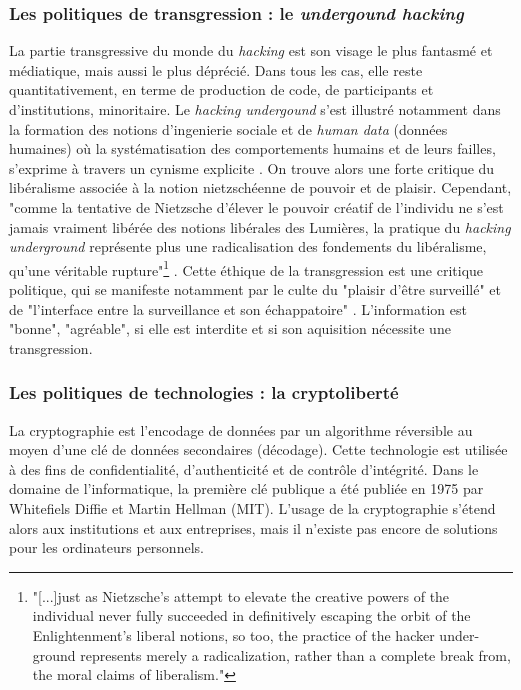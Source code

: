 \subsubsection{Les politiques de transgression : le \emph{undergound hacking}} \label{2.2.2.a}

La partie transgressive  du monde du \emph{hacking} est son visage le plus fantasmé et médiatique, mais aussi le plus déprécié. Dans tous les cas, elle reste quantitativement, en terme de production de code, de participants et d'institutions, minoritaire. Le \emph{hacking undergound} s'est illustré notamment dans la formation des notions d'ingenierie sociale et de \emph{human data} (données humaines) où la systématisation des comportements humains et de leurs failles, s'exprime à travers un cynisme explicite \citep{Mitnick+Simon2002}. On trouve alors une forte critique du libéralisme associée à la notion nietzschéenne de pouvoir et de plaisir. Cependant, "comme la tentative de Nietzsche d'élever le pouvoir créatif de l'individu ne s'est jamais vraiment libérée des notions libérales des Lumières, la pratique du \emph{hacking underground} représente plus une radicalisation des fondements du libéralisme, qu'une véritable rupture"\footnote{"[...]just as Nietzsche’s attempt to elevate the creative powers of the individual never fully succeeded in definitively escaping the orbit of the Enlightenment’s liberal notions, so too, the practice of the hacker under-ground represents merely a radicalization, rather than a complete break from, the moral claims of liberalism."} \citep[p.263]{Coleman+Golub2008}. Cette éthique de la transgression est une critique politique, qui se manifeste notamment par le culte du "plaisir d'être surveillé" et de "l'interface entre la surveillance et son échappatoire" \citep{Hebdige1997}. L'information est "bonne", "agréable", si elle est interdite et si son aquisition nécessite une transgression.

\subsubsection{Les politiques de technologies : la cryptoliberté} \label{2.2.2.b}

La cryptographie est l'encodage de données par un algorithme réversible au moyen d'une clé de données secondaires (décodage). Cette technologie est utilisée à des fins de confidentialité, d'authenticité et de contrôle d'intégrité. Dans le domaine de l'informatique, la première clé publique a été publiée en 1975 par Whitefiels Diffie et Martin Hellman (MIT). L'usage de la cryptographie s'étend alors aux institutions et aux entreprises, mais il n'existe pas encore de solutions pour les ordinateurs personnels.

